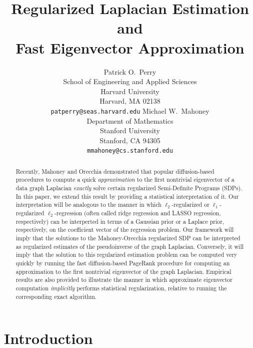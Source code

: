 \documentclass[12pt]{article}
\title{
  Regularized Laplacian Estimation
  and \\ Fast Eigenvector Approximation
}
\author{
  Patrick O.~Perry \\
  School of Engineering and Applied Sciences \\
  Harvard University \\
  Harvard, MA 02138 \\
  \texttt{patperry@seas.harvard.edu} 
  \And
  Michael W.~Mahoney \\
  Department of Mathematics \\
  Stanford University \\
  Stanford, CA 94305  \\
  \texttt{mmahoney@cs.stanford.edu}
}
\theoremstyle{plain}
\begin{document}
\maketitle

\begin{abstract}
Recently, Mahoney and Orecchia demonstrated that popular diffusion-based 
procedures to compute a quick \emph{approximation} to the first nontrivial 
eigenvector of a data graph Laplacian \emph{exactly} solve certain 
regularized Semi-Definite Programs (SDPs). 
In this paper, we extend this result by providing a statistical 
interpretation of it.
Our interpretation will be analogous to the manner in which
$\ell_2$-regularized or $\ell_1$-regularized $\ell_2$-regression (often
called ridge regression and LASSO regression, respectively) can be
interperted in terms of a Gaussian prior or a Laplace prior, respectively,
on the coefficient vector of the regression problem.
Our framework will imply that the solutions to the Mahoney-Orecchia 
regularized SDP can be interpreted as regularized estimates of the 
pseudoinverse of the graph Laplacian.
Conversely, it will imply that the solution to this regularized estimation 
problem can be computed very quickly by running the fast diffusion-based 
PageRank procedure for computing an approximation to the first nontrivial 
eigenvector of the graph Laplacian.
Empirical results are also provided to illustrate the manner in which 
approximate eigenvector computation \emph{implicitly} performs statistical 
regularization, relative to running the corresponding exact algorithm.
\end{abstract}



\section{Introduction}
\label{sxn:intro}
\end{document}
